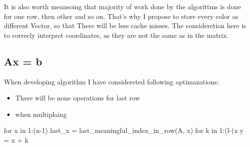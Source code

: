 \documentclass{article}
\begin{document}
It is also worth meansoing that majority of work done by the algorittms is done for one row, then other and so on. That's why I propose to store every color as different Vector, so that There will be less cache misses. The consideretion here is to correcly interpret coordinates, as they are not the same as in the matrix.
\subsection*{Ax = b}
When developing algorithm I have considereted following optimazations:
\begin{itemize}
    \item{There will be none operations for last row}
    \item{when multiplaing }
\end{itemize}

\begin{algorithmic}
    for x in 1:(n-1)
            last_x = last_meaningful_index_in_row(A, x)
            for k in 1:(l-(x%
                y = x + k
\end{algorithmic}
\end{document}

